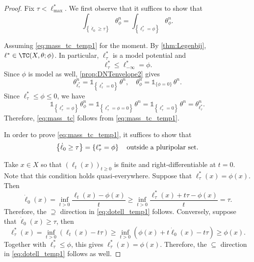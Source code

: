 \begin{proof}
    Fix $\tau<\ell^*_{\max}$.
    We first observe that it suffices to show that
    \begin{equation}\label{eq:mass_tc_temp1}
    \int_{\left\{\dot{\ell}_0\geq \tau\right\}} \theta_{\phi}^n=\int_{\left\{\ell^*_{\tau}=\phi\right\}} \theta_{\phi}^n.
    \end{equation}

    Assuming \eqref{eq:mass_tc_temp1} for the moment.
    By \cref{thm:Legenbij}, $\ell^*\in\TC(X,\theta;\phi)$. In particular, $\ell^*_\tau$ is a model potential and
    \[
        \ell^*_\tau\leq \ell^*_{-\infty}=\phi.
    \]
    Since $\phi$ is model as well, \cref{prop:DNTenvelope2} gives
    \[
        \theta^n_{\ell^*_{\tau}}=\mathds{1}_{\left\{\ell^*_{\tau}=0\right\}}\,\theta^n,\quad \theta^n_{\phi}=\mathds{1}_{\{\phi=0\}}\,\theta^n.
    \]
    Since $\ell^*_{\tau}\leq \phi \leq 0$, we have
    \[
        \mathds{1}_{\left\{\ell^*_{\tau}=\phi\right\}}\,\theta_{\phi}^n
        =\mathds{1}_{\left\{\ell^*_{\tau}=\phi=0\right\}}\,\theta^n
        =\mathds{1}_{\left\{\ell^*_{\tau}=0\right\}}\,\theta^n
        =\theta^n_{\ell^*_{\tau}}.
    \]
    Therefore, \eqref{eq:mass_tc} follows from \eqref{eq:mass_tc_temp1}.

    In order to prove \eqref{eq:mass_tc_temp1}, it suffices to show that
    \begin{equation}\label{eq:dotell_temp1}
    \left\{\dot{\ell}_0\geq \tau\right\}=\left\{\ell^*_{\tau}=\phi\right\}\quad \textup{outside a pluripolar set}.
    \end{equation}

    Take $x\in X$ so that $(\ell_t(x))_{t\geq 0}$ is finite and right-differentiable at $t=0$. Note that this condition holds quasi-everywhere. Suppose that $\ell^*_{\tau}(x)=\phi(x)$. Then
    \[
    \dot{\ell}_0(x)=\inf_{t>0} \frac{\ell_t(x)-\phi(x)}{t}\geq \inf_{t>0} \frac{\ell^*_{\tau}(x)+t\tau-\phi(x)}{t}=\tau.
    \]
    Therefore, the $\supseteq$ direction in \eqref{eq:dotell_temp1} follows.
    Conversely, suppose that $\dot{\ell}_0(x)\geq \tau$, then
    \[
    \ell^*_{\tau}(x)=\inf_{t>0} \left(\ell_t(x)-t\tau\right)\geq \inf_{t>0} \left(\phi(x)+t\dot{\ell}_0(x)-t\tau\right)\geq \phi(x).
    \]
    Together with $\ell^*_\tau\leq\phi$, this gives $\ell^*_\tau(x)=\phi(x)$.
    Therefore, the $\subseteq$ direction in \eqref{eq:dotell_temp1}  follows as well.
\end{proof}

